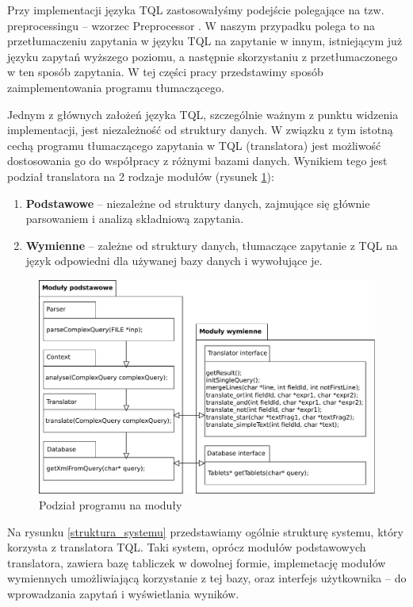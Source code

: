 
Przy implementacji języka TQL zastosowałyśmy podejście polegające na tzw. preprocessingu -- wzorzec Preprocessor \cite{mernik}.
W naszym przypadku polega to na przetłumaczeniu zapytania w języku TQL na zapytanie w innym, istniejącym już języku zapytań wyższego poziomu,
a następnie skorzystaniu z przetłumaczonego w ten sposób zapytania. W tej części pracy przedstawimy sposób zaimplementowania programu tłumaczącego.

Jednym z głównych założeń języka TQL, szczególnie ważnym z punktu widzenia implementacji, jest niezależność od struktury danych.
W związku z tym istotną cechą programu tłumaczącego zapytania w TQL (translatora) jest możliwość dostosowania  
go do współpracy z różnymi bazami danych.
 Wynikiem tego jest podział translatora na 2 rodzaje modułów (rysunek \ref{moduly}):
\begin{enumerate}
 \item \textbf{Podstawowe} -- niezależne od struktury danych, zajmujące się głównie parsowaniem i analizą składniową zapytania.
 \item \textbf{Wymienne} -- zależne od struktury danych, tłumaczące zapytanie z TQL na język odpowiedni dla używanej bazy danych
i wywołujące je.
\end{enumerate}

\begin{figure}[h]
 \centering
 \includegraphics[width=450px]{../diagramy/pakiety.pdf}
 \caption{Podział programu na moduły}
 \label{moduly}
\end{figure}


Na rysunku \ref{struktura_systemu} przedstawiamy ogólnie strukturę systemu, który korzysta z translatora TQL. Taki system, oprócz modułów podstawowych translatora, zawiera bazę tabliczek w dowolnej formie, implemetację modułów wymiennych umożliwiającą korzystanie z tej bazy, oraz interfejs użytkownika -- do wprowadzania zapytań i wyświetlania wyników. \\

